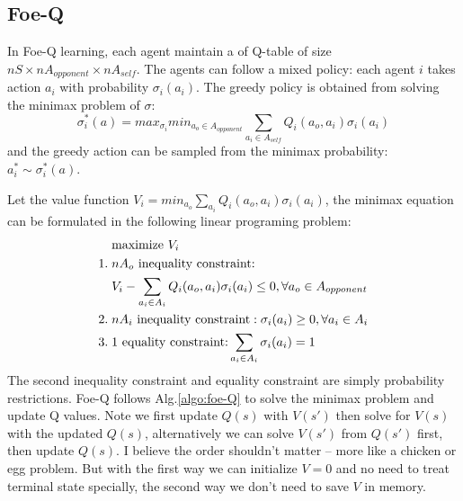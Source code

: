 \documentclass[conference]{IEEEtran}
\begin{document}
\subsection{Foe-Q}
In Foe-Q learning, each agent maintain a of Q-table of size $nS \times nA_{opponent} \times nA_{self}$. The agents can follow a mixed policy: each agent $i$ takes action $a_i$ with probability $\sigma_i(a_i)$. The greedy policy is obtained from solving the minimax problem of $\sigma$:
\begin{equation}
\sigma_i^*(a) = max_{\sigma_i} min_{a_o\in A_{opponent}} \sum_{a_i\in A_{self}}Q_i(a_o, a_i) \sigma_i(a_i)
\end{equation}
and the greedy action can be sampled from the minimax probability: $a_i^* \sim \sigma_i^*(a)$.

Let the value function $V_i = min_{a_o} \sum_{a_i}Q_i(a_o, a_i) \sigma_i(a_i)$, the minimax equation can be formulated in the following linear programing problem:
\begin{align}
& \text{maximize $V_i$} \\
1.\; & \text{$nA_o$ inequality constraint:} \notag \notag\\
& V_i-\sum_{a_i\in A_i} Q_i(a_o, a_i)\sigma_i(a_i)\le 0, \forall a_o \in A_{opponent} \notag \\ 
2.\; & \text{$nA_i$ inequality constraint}:  \sigma_i(a_i) \ge 0, \forall a_i\in A_i \notag\\
3.\; & \text{1 equality constraint:} \sum_{a_i\in A_i} \sigma_i(a_i) = 1 \\
\end{align}
The second inequality constraint and equality constraint are simply probability restrictions. Foe-Q follows Alg.\ref{algo:foe-Q} to solve the minimax problem and update Q values. Note we first update $Q(s)$ with $V(s')$ then solve for $V(s)$ with the updated $Q(s)$, alternatively we can solve $V(s')$ from $Q(s')$ first, then update $Q(s)$. I believe the order shouldn't matter -- more like a chicken or egg problem. But with the first way we can initialize $V=0$ and no need to treat terminal state specially, the second way we don't need to save $V$ in memory.
\end{document}
